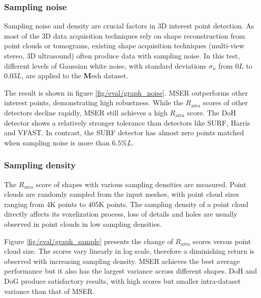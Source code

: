 \subsubsection{Sampling noise}

Sampling noise and density are crucial factors in 3D interest point detection. As most of the 3D data acquisition techniques rely on shape reconstruction from point clouds or tomograms, existing shape acquisition techniques (\eg multi-view stereo, 3D ultrasound) often produce data with sampling noise. 
In this test, different levels of Gaussian white noise, with standard deviations $\sigma_{n}$ from $0L$ to $0.03L$, are applied to the {\textbf Mesh} dataset.

The result is shown in figure \ref{fig/eval/graph_noise}. MSER outperforms other interest points, demonstrating high robustness. While the $R_{\textrm{area}}$ scores of other detectors decline rapidly,
MSER still achieves a high $R_{\textrm{area}}$ score. The DoH detector shows a relatively stronger tolerance than detectors like SURF, Harris and VFAST. In contrast, the SURF detector has almost zero points matched when sampling noise is more than $6.5\%L$.

\subsubsection{Sampling density}

The $R_{\textrm{area}}$ score of shapes with various sampling densities are measured. Point clouds are randomly sampled from the input meshes, with point cloud sizes ranging from $4$K points to $405$K points. The sampling density of a point cloud directly affects its voxelization process, loss of details and holes are usually observed in point clouds in low sampling densities. 

Figure \ref{fig/eval/graph_sample} presents the change of $R_{\textrm{area}}$ scores versus point cloud size. The scores vary linearly in log scale, therefore a diminishing return is observed with increasing sampling density. MSER achieves the best average performance but it also has the largest variance across different shapes. DoH and DoG produce satisfactory results, with high scores but smaller intra-dataset variance than that of MSER.

